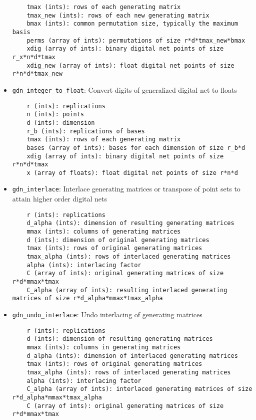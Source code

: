 \begin{itemize}
\begin{lstlisting}
    tmax (ints): rows of each generating matrix
    tmax_new (ints): rows of each new generating matrix
    bmax (ints): common permutation size, typically the maximum basis
    perms (array of ints): permutations of size r*d*tmax_new*bmax
    xdig (array of ints): binary digital net points of size r_x*n*d*tmax
    xdig_new (array of ints): float digital net points of size r*n*d*tmax_new
\end{lstlisting}
\item
\texttt{gdn\_integer\_to\_float}: 
Convert digits of generalized digital net to floats
\begin{lstlisting}
	r (ints): replications
    n (ints): points
    d (ints): dimension
    r_b (ints): replications of bases 
    tmax (ints): rows of each generating matrix
    bases (array of ints): bases for each dimension of size r_b*d
    xdig (array of ints): binary digital net points of size r*n*d*tmax
    x (array of floats): float digital net points of size r*n*d
\end{lstlisting}
\item
\texttt{gdn\_interlace}: 
Interlace generating matrices or transpose of point sets to attain higher order digital nets
\begin{lstlisting}
	r (ints): replications
    d_alpha (ints): dimension of resulting generating matrices 
    mmax (ints): columns of generating matrices
    d (ints): dimension of original generating matrices
    tmax (ints): rows of original generating matrices
    tmax_alpha (ints): rows of interlaced generating matrices
    alpha (ints): interlacing factor
    C (array of ints): original generating matrices of size r*d*mmax*tmax
    C_alpha (array of ints): resulting interlaced generating matrices of size r*d_alpha*mmax*tmax_alpha
\end{lstlisting}
\item
\texttt{gdn\_undo\_interlace}: 
Undo interlacing of generating matrices
\begin{lstlisting}
	r (ints): replications
    d (ints): dimension of resulting generating matrices 
    mmax (ints): columns in generating matrices
    d_alpha (ints): dimension of interlaced generating matrices
    tmax (ints): rows of original generating matrices
    tmax_alpha (ints): rows of interlaced generating matrices
    alpha (ints): interlacing factor
    C_alpha (array of ints): interlaced generating matrices of size r*d_alpha*mmax*tmax_alpha
    C (array of ints): original generating matrices of size r*d*mmax*tmax
\end{lstlisting}

\end{itemize}
